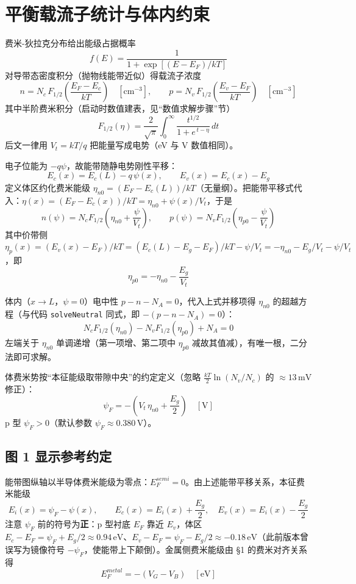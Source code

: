 \documentclass[11pt]{ctexart}
\begin{document}
\section{平衡载流子统计与体内约束}

费米-狄拉克分布给出能级占据概率
\[f(E)=\frac{1}{1+\exp[(E-E_F)/kT]}\]
对导带态密度积分（抛物线能带近似）得载流子浓度
\[n=N_c\,F_{1/2}\!\left(\frac{E_F-E_c}{kT}\right)\quad [\mathrm{cm^{-3}}],\qquad p=N_v\,F_{1/2}\!\left(\frac{E_v-E_F}{kT}\right)\quad [\mathrm{cm^{-3}}]\]
其中半阶费米积分（启动时数值建表，见“数值求解步骤”节）
\[F_{1/2}(\eta)=\frac{2}{\sqrt{\pi}}\int_0^{\infty}\frac{t^{1/2}}{1+e^{\,t-\eta}}\,dt\]
后文一律用
\(V_t=kT/q\) 把能量写成电势（eV 与 V 数值相同）。

电子位能为 $-q\psi$，故能带随静电势刚性平移：
\[E_c(x)=E_c(L)-q\,\psi(x),\qquad E_v(x)=E_c(x)-E_g\]
定义体区约化费米能级
\(\eta_{n0}=(E_F-E_c(L))/kT\)（无量纲）。把能带平移式代入：$\eta(x)=(E_F-E_c(x))/kT=\eta_{n0}+\psi(x)/V_t$，于是
\[n(\psi)=N_c F_{1/2}\!\left(\eta_{n0}+\frac{\psi}{V_t}\right),\qquad p(\psi)=N_v F_{1/2}\!\left(\eta_{p0}-\frac{\psi}{V_t}\right)\]
其中价带侧 $\eta_p(x)=(E_v(x)-E_F)/kT=(E_c(L)-E_g-E_F)/kT-\psi/V_t=-\eta_{n0}-E_g/V_t-\psi/V_t$，即
\[\eta_{p0}=-\eta_{n0}-\frac{E_g}{V_t}\]

体内（$x\to L$，$\psi=0$）电中性 $p-n-N_A=0$，代入上式并移项得 $\eta_{n0}$ 的超越方程（与代码 \texttt{solveNeutral} 同式，即 $-(p-n-N_A)=0$）：
\[N_c F_{1/2}(\eta_{n0})-N_v F_{1/2}(\eta_{p0})+N_A=0\]
左端关于 $\eta_{n0}$ 单调递增（第一项增、第二项中 $\eta_{p0}$ 减故其值减），有唯一根，二分法即可求解。

体费米势按“本征能级取带隙中央”的约定定义（忽略 $\frac{kT}{2}\ln(N_v/N_c)$ 的 $\approx 13\,\mathrm{mV}$ 修正）：
\[\psi_F=-\left(V_t\,\eta_{n0}+\frac{E_g}{2}\right)\quad [\mathrm{V}]\]
p 型 $\psi_F>0$（默认参数 $\psi_F\approx 0.380\,\mathrm{V}$）。

\subsection{图 1 显示参考约定}
能带图纵轴以半导体费米能级为零点：$E_F^{semi}=0$。由上述能带平移关系，本征费米能级
\[E_i(x)=\psi_F-\psi(x),\qquad E_c(x)=E_i(x)+\frac{E_g}{2},\quad E_v(x)=E_i(x)-\frac{E_g}{2}\]
注意 $\psi_F$ 前的符号为\textbf{正}：p 型衬底 $E_F$ 靠近 $E_v$，体区 $E_c-E_F=\psi_F+E_g/2\approx0.94\,\mathrm{eV}$、$E_v-E_F=\psi_F-E_g/2\approx-0.18\,\mathrm{eV}$（此前版本曾误写为镜像符号 $-\psi_F$，使能带上下颠倒）。金属侧费米能级由 §1 的费米对齐关系得
\[E_F^{metal}=-(V_G-V_B)\quad [\mathrm{eV}]\]
\end{document}
